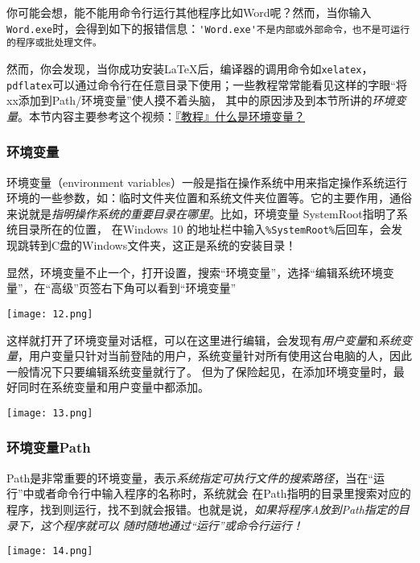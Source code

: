 你可能会想，能不能用命令行运行其他程序比如Word呢？然而，当你输入\verb"Word.exe"时，会得到如下的报错信息：\verb"'Word.exe'不是内部或外部命令，也不是可运行的程序或批处理文件。"

然而，你会发现，当你成功安装\LaTeX{}后，编译器的调用命令如\verb"xelatex"，\verb"pdflatex"可以通过命令行在任意目录下使用；一些教程常常能看见这样的字眼“将xx添加到Path/环境变量”使人摸不着头脑，
其中的原因涉及到本节所讲的\emph{环境变量}。本节内容主要参考这个视频：\href{https://www.bilibili.com/video/BV1w741147G9?from=search&seid=9151606959931684460&spm_id_from=333.337.0.0}{『教程』什么是环境变量？}



\subsubsection{环境变量}\label{subsub:hjbl}


环境变量（environment variables）一般是指在操作系统中用来指定操作系统运行环境的一些参数，如：临时文件夹位置和系统文件夹位置等。它的主要作用，通俗来说就是\emph{指明操作系统的重要目录在哪里}。比如，环境变量 SystemRoot指明了系统目录所在的位置，
在Windows 10 的地址栏中输入\verb"%SystemRoot%"后回车，会发现跳转到C盘的Windows文件夹，这正是系统的安装目录！

显然，环境变量不止一个，打开设置，搜索“环境变量”，选择“编辑系统环境变量”，在“高级”页签右下角可以看到“环境变量”
\begin{center}
  \texttt{[image: 12.png]}
\end{center}

这样就打开了环境变量对话框，可以在这里进行编辑，会发现有\emph{用户变量}和\emph{系统变量}，用户变量只针对当前登陆的用户，系统变量针对所有使用这台电脑的人，因此一般情况下只要编辑系统变量就行了。
但为了保险起见，在添加环境变量时，最好同时在系统变量和用户变量中都添加。
\begin{center}
  \texttt{[image: 13.png]}
\end{center}




\subsubsection{环境变量Path}\label{subsub:pa}


Path是非常重要的环境变量，表示\emph{系统指定可执行文件的搜索路径}，当在“运行”中或者命令行中输入程序的名称时，系统就会
在Path指明的目录里搜索对应的程序，找到则运行，找不到就会报错。也就是说，\emph{如果将程序A放到Path指定的目录下，这个程序就可以
随时随地通过“运行”或命令行运行！}
\begin{center}
  \texttt{[image: 14.png]}
\end{center}

